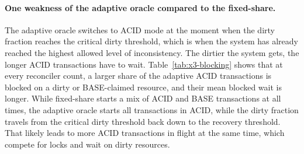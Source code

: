 \paragraph{One weakness of the adaptive oracle compared to the fixed-share.} The
adaptive oracle switches to ACID mode at the moment when the dirty fraction
reaches the critical dirty threshold, which is when the system has already reached
the highest allowed level of inconsistency. The dirtier the system gets, the longer
ACID transactions have to wait. Table~\ref{tab:x3-blocking} shows that at every
reconciler count, a larger share of the adaptive ACID transactions is blocked on
a dirty or BASE-claimed resource, and their mean blocked wait is longer. While
fixed-share starts a mix of ACID and BASE transactions at all times, the adaptive oracle
starts all transactions in ACID, while the dirty fraction travels from the
critical dirty threshold back down to the recovery threshold. That likely leads
to more ACID transactions in flight at the same time, which compete for locks
and wait on dirty resources.

